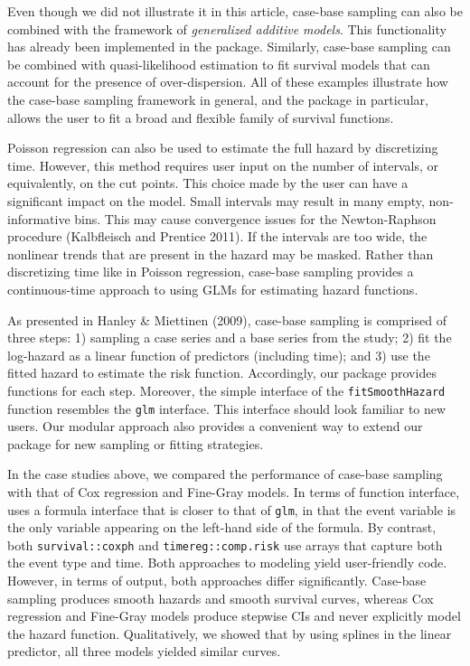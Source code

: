 Even though we did not illustrate it in this article, case-base sampling can also be combined with the framework of \emph{generalized additive models}. This functionality has already been implemented in the package. Similarly, case-base sampling can be combined with quasi-likelihood estimation to fit survival models that can account for the presence of over-dispersion. All of these examples illustrate how the case-base sampling framework in general, and the package  in particular, allows the user to fit a broad and flexible family of survival functions.

Poisson regression can also be used to estimate the full hazard by discretizing time. However, this method requires user input on the number of intervals, or equivalently, on the cut points. This choice made by the user can have a significant impact on the model. Small intervals may result in many empty, non-informative bins. This may cause convergence issues for the Newton-Raphson procedure (Kalbfleisch and Prentice 2011). If the intervals are too wide, the nonlinear trends that are present in the hazard may be masked. Rather than discretizing time like in Poisson regression, case-base sampling provides a continuous-time approach to using GLMs for estimating hazard functions.

As presented in Hanley \& Miettinen (2009), case-base sampling is comprised of three steps: 1) sampling a case series and a base series from the study; 2) fit the log-hazard as a linear function of predictors (including time); and 3) use the fitted hazard to estimate the risk function. Accordingly, our package provides functions for each step. Moreover, the simple interface of the \texttt{fitSmoothHazard} function resembles the \texttt{glm} interface. This interface should look familiar to new users. Our modular approach also provides a convenient way to extend our package for new sampling or fitting strategies.

In the case studies above, we compared the performance of case-base sampling with that of Cox regression and Fine-Gray models. In terms of function interface,  uses a formula interface that is closer to that of \texttt{glm}, in that the event variable is the only variable appearing on the left-hand side of the formula. By contrast, both \texttt{survival::coxph} and \texttt{timereg::comp.risk} use arrays that capture both the event type and time. Both approaches to modeling yield user-friendly code. However, in terms of output, both approaches differ significantly. Case-base sampling produces smooth hazards and smooth survival curves, whereas Cox regression and Fine-Gray models produce stepwise CIs and never explicitly model the hazard function. Qualitatively, we showed that by using splines in the linear predictor, all three models yielded similar curves.

